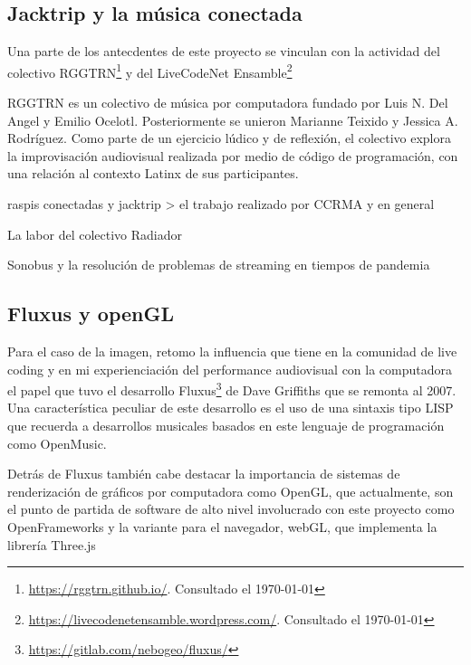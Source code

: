 \subsection{Jacktrip y la música conectada}

Una parte de los antecdentes de este proyecto se vinculan con la actividad del colectivo RGGTRN\footnote{\url{https://rggtrn.github.io/}. Consultado el \today} y del LiveCodeNet Ensamble\footnote{\url{https://livecodenetensamble.wordpress.com/}. Consultado el \today}

RGGTRN es un colectivo de música por computadora fundado por Luis N. Del Angel y Emilio Ocelotl. Posteriormente se unieron Marianne Teixido y Jessica A. Rodríguez. Como parte de un ejercicio lúdico y de reflexión, el colectivo explora la improvisación audiovisual realizada por medio de código de programación, con una relación al contexto Latinx de sus participantes.


raspis conectadas y jacktrip > el trabajo realizado por CCRMA y en general 

La labor del colectivo Radiador


Sonobus y la resolución de problemas de streaming en tiempos de pandemia

\subsection{Fluxus y openGL}

Para el caso de la imagen, retomo la influencia que tiene en la comunidad de live coding y en mi experienciación del performance audiovisual con la computadora el papel que tuvo el desarrollo Fluxus\footnote{\url{https://gitlab.com/nebogeo/fluxus/}} de Dave Griffiths que se remonta al 2007. Una característica peculiar de este desarrollo es el uso de una sintaxis tipo LISP que recuerda a desarrollos musicales basados en este lenguaje de programación como OpenMusic. 

Detrás de Fluxus también cabe destacar la importancia de sistemas de renderización de gráficos por computadora como OpenGL, que actualmente, son el punto de partida de software de alto nivel involucrado con este proyecto como OpenFrameworks y la variante para el navegador, webGL, que implementa la librería Three.js 

